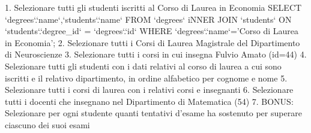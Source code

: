 1. Selezionare tutti gli studenti iscritti al Corso di Laurea in Economia
SELECT `degrees`.`name`,`students`.`name` FROM `degrees` iNNER JOIN `students` ON `students`.`degree_id` = `degrees`.`id` WHERE `degrees`.`name`='Corso di Laurea in Economia';
2. Selezionare tutti i Corsi di Laurea Magistrale del Dipartimento di Neuroscienze
3. Selezionare tutti i corsi in cui insegna Fulvio Amato (id=44)
4. Selezionare tutti gli studenti con i dati relativi al corso di laurea a cui sono iscritti e il
relativo dipartimento, in ordine alfabetico per cognome e nome
5. Selezionare tutti i corsi di laurea con i relativi corsi e insegnanti
6. Selezionare tutti i docenti che insegnano nel Dipartimento di Matematica (54)
7. BONUS: Selezionare per ogni studente quanti tentativi d’esame ha sostenuto per
superare ciascuno dei suoi esami